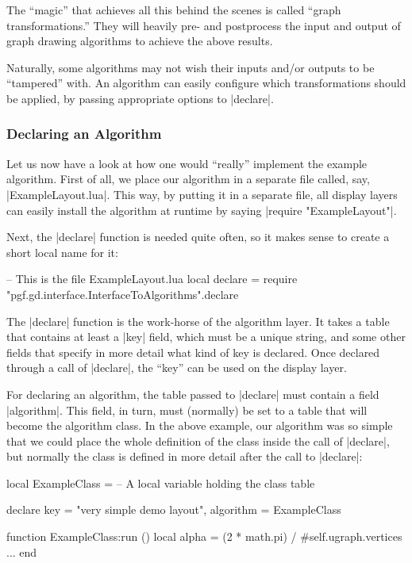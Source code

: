The ``magic'' that achieves all this behind the scenes is called 
``graph transformations.'' They will heavily pre- and postprocess the
input and output of graph drawing algorithms to achieve the above
results. 

Naturally, some algorithms may not wish their inputs and/or
outputs to be ``tampered'' with. An algorithm can easily configure
which transformations should be applied, by passing appropriate options
to |declare|.


\subsubsection{Declaring an Algorithm}

Let us now have a look at how one would ``really'' implement the
example algorithm. First of all, we place our algorithm in a
separate file called, say, |ExampleLayout.lua|. This way, by putting
it in a separate file, all display layers can easily install the
algorithm at runtime by saying |require "ExampleLayout"|.

Next, the |declare| function is needed quite often, so it makes sense
to create a short local name for it:

\begin{codeexample}[code only, tikz syntax=false]
-- This is the file ExampleLayout.lua
local declare = require "pgf.gd.interface.InterfaceToAlgorithms".declare  
\end{codeexample}

The |declare| function is the work-horse of the algorithm layer. It
takes a table that contains at least a |key| field, which must be a
unique string, and some other fields that specify in more detail what
kind of key is declared. Once declared through a call of |declare|,
the ``key'' can be used on the display layer.

For declaring an algorithm, the table passed to |declare| must contain
a field |algorithm|. This field, in turn, must (normally) be set to a
table that will become the algorithm class. In the above example, our
algorithm was so simple that we could place the whole definition of
the class inside the call of |declare|, but normally the class is
defined in more detail after the call to |declare|:

\begin{codeexample}[code only, tikz syntax=false]
local ExampleClass = {}  -- A local variable holding the class table

declare {
  key = "very simple demo layout",
  algorithm = ExampleClass
}

function ExampleClass:run ()
  local alpha = (2 * math.pi) / #self.ugraph.vertices
  ...
end
\end{codeexample}

